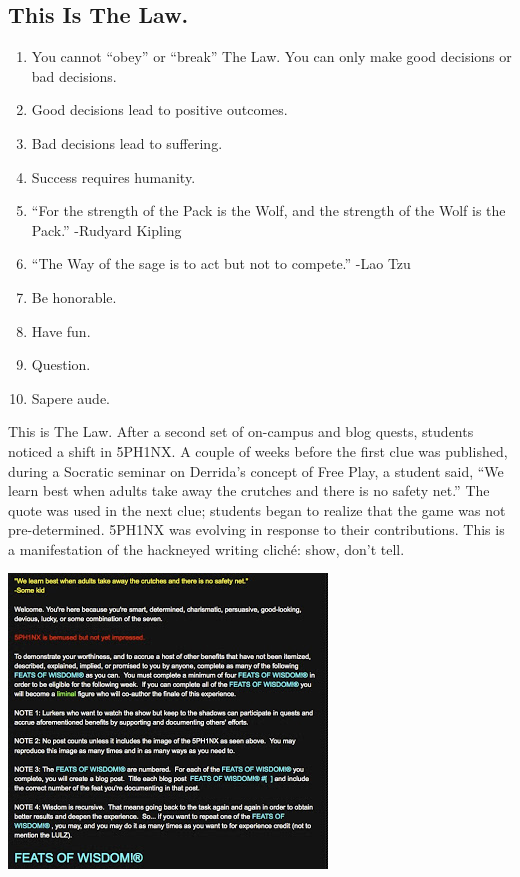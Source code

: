 \subsection{This Is The Law.}

\begin{enumerate}[itemsep=0pt]
\item
  You cannot ``obey'' or ``break'' The Law. You can only make good
  decisions or bad decisions.
\item
  Good decisions lead to positive outcomes.
\item
  Bad decisions lead to suffering.
\item
  Success requires humanity.
\item
  ``For the strength of the Pack is the Wolf, and the strength of the
  Wolf is the Pack.'' -Rudyard Kipling
\item
  ``The Way of the sage is to act but not to compete.'' -Lao Tzu
\item
  Be honorable.
\item
  Have fun.
\item
  Question.
\item
  Sapere aude.
\end{enumerate}
This is The Law. After a second set of on-campus and blog quests,
students noticed a shift in 5PH1NX. A couple of weeks before the first
clue was published, during a Socratic seminar on Derrida's concept of
Free Play, a student said, ``We learn best when adults take away the
crutches and there is no safety net.'' The quote was used in the next
clue; students began to realize that the game was not pre-determined.
5PH1NX was evolving in response to their contributions. This is a
manifestation of the hackneyed writing cliché: show, don't tell.
\begin{center}
\includegraphics{../pictures/best_when.jpg}
\end{center}
